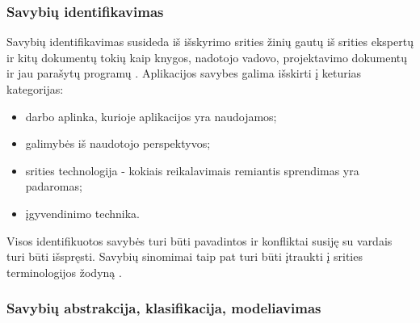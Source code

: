\documentclass{VUMIFPSkursinis}
\begin{document}
\subsubsection{Savybių identifikavimas} \label{identifikavimas}

Savybių identifikavimas susideda iš išskyrimo srities žinių gautų iš srities ekspertų ir kitų dokumentų tokių kaip knygos, nadotojo vadovo, projektavimo dokumentų ir jau parašytų programų \cite{Lee2015}. Aplikacijos savybes galima išskirti į keturias kategorijas:
\begin{itemize}[topsep=0pt,itemsep=-1ex,partopsep=1ex,parsep=1ex]
\item darbo aplinka, kurioje aplikacijos yra naudojamos;
\item galimybės iš naudotojo perspektyvos;
\item srities technologija - kokiais reikalavimais remiantis sprendimas yra padaromas;
\item įgyvendinimo technika.
\end{itemize}




Visos identifikuotos savybės turi būti pavadintos ir konfliktai susiję su vardais turi būti išspręsti. Savybių sinomimai taip pat turi būti įtraukti į srities terminologijos žodyną \cite{Kang1990}.

\subsubsection{Savybių abstrakcija, klasifikacija, modeliavimas}
\end{document}
